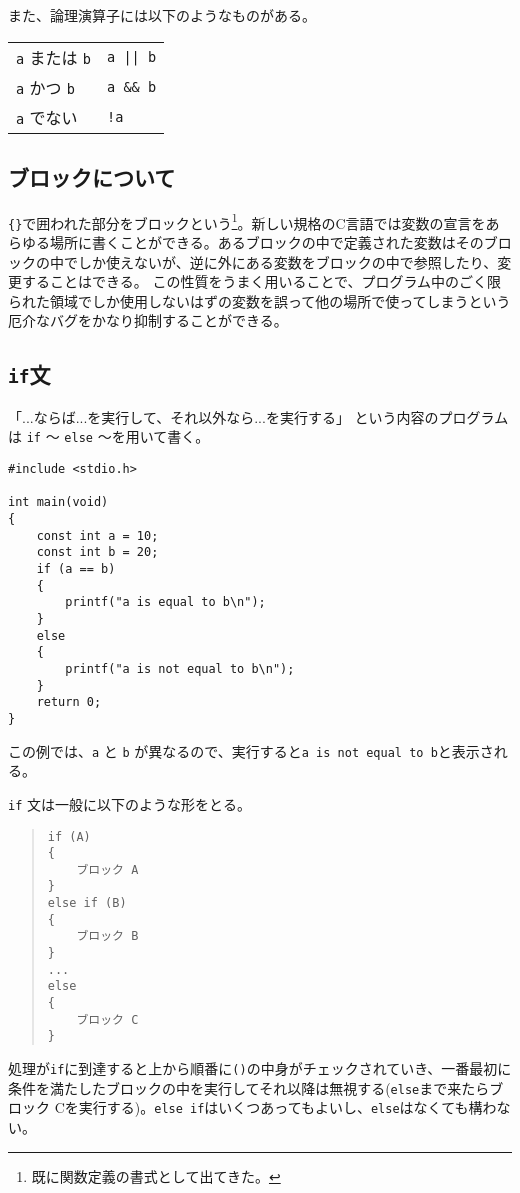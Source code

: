 また、論理演算子には以下のようなものがある。
\begin{table}[H]
    \centering
    \begin{tabular}{ll}
        \texttt{a} または \texttt{b} & \texttt{a || b}   \\
        \texttt{a} かつ \texttt{b}   & \texttt{a \&\& b} \\
        \texttt{a} でない            & \texttt{!a}       \\
    \end{tabular}
\end{table}

\subsection{ブロックについて}
\texttt{\{\}}で囲われた部分をブロックという\footnote{既に関数定義の書式として出てきた。}。新しい規格のC言語では変数の宣言をあらゆる場所に書くことができる。あるブロックの中で定義された変数はそのブロックの中でしか使えないが、逆に外にある変数をブロックの中で参照したり、変更することはできる。
この性質をうまく用いることで、プログラム中のごく限られた領域でしか使用しないはずの変数を誤って他の場所で使ってしまうという厄介なバグをかなり抑制することができる。

\subsection{\texttt{if}文}
「...ならば...を実行して、それ以外なら...を実行する」
という内容のプログラムは \texttt{if} 〜 \texttt{else} 〜を用いて書く。
\begin{reidai}\label{ex:if}
    \begin{verbatim}
#include <stdio.h>

int main(void)
{
    const int a = 10;
    const int b = 20;
    if (a == b)
    {
        printf("a is equal to b\n");
    }
    else
    {
        printf("a is not equal to b\n");
    }
    return 0;
}
\end{verbatim}
\end{reidai} \noindent
この例では、\texttt{a} と \texttt{b} が異なるので、実行すると\texttt{a is not equal to b}と表示される。

\texttt{if} 文は一般に以下のような形をとる。
\begin{quote}
\begin{verbatim}
if (A)
{
    ブロック A
}
else if (B)
{
    ブロック B
}
...
else
{
    ブロック C
}
\end{verbatim}
\end{quote} \noindent
処理が\texttt{if}に到達すると上から順番に\texttt{()}の中身がチェックされていき、一番最初に条件を満たしたブロックの中を実行してそれ以降は無視する(\texttt{else}まで来たらブロック Cを実行する)。\texttt{else if}はいくつあってもよいし、\texttt{else}はなくても構わない。

